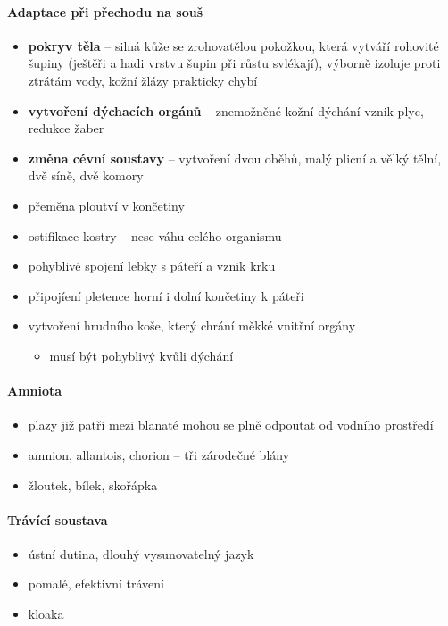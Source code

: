 \paragraph{Adaptace při přechodu na souš}
\begin{itemize}
\item \textbf{pokryv těla} -- silná kůže se zrohovatělou pokožkou, která vytváří rohovité šupiny (ještěři a hadi vrstvu šupin při růstu svlékají), výborně izoluje proti ztrátám vody, kožní žlázy prakticky chybí
\item \textbf{vytvoření dýchacích orgánů} -- znemožněné kožní dýchání \ra vznik plyc, redukce žaber
\item \textbf{změna cévní soustavy} -- vytvoření dvou oběhů, malý plicní a vělký tělní, dvě síně, dvě komory
\item přeměna ploutví v končetiny
\item ostifikace kostry -- nese váhu celého organismu
\item pohyblivé spojení lebky s páteří a vznik krku
\item připojíení pletence horní i dolní končetiny k páteři
\item vytvoření hrudního koše, který chrání měkké vnitřní orgány
	\begin{itemize}
	\item musí být pohyblivý kvůli dýchání
	\end{itemize}
\end{itemize}

\paragraph{Amniota}
\begin{itemize}
\item plazy již patří mezi blanaté \ra mohou se plně odpoutat od vodního prostředí
\item amnion, allantois, chorion -- tři zárodečné blány
\item žloutek, bílek, skořápka
\end{itemize}

\paragraph{Trávící soustava}
\begin{itemize}
\item ústní dutina, dlouhý vysunovatelný jazyk
\item pomalé, efektivní trávení
\item kloaka
\end{itemize}

